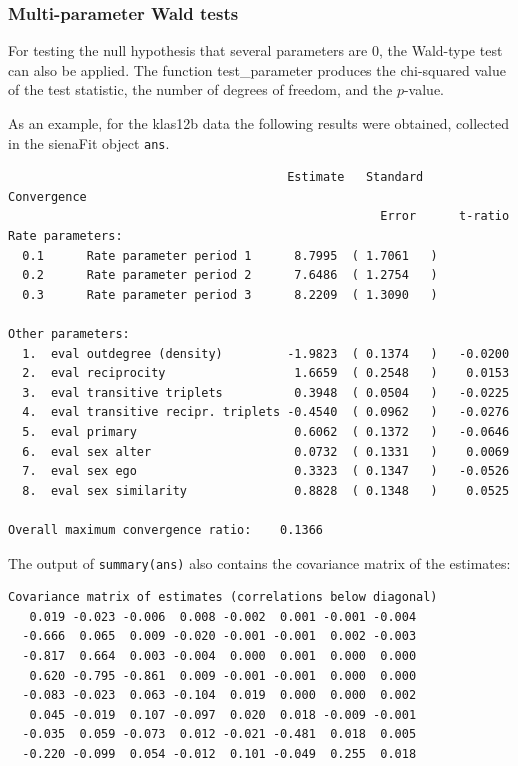 \documentclass[a4paper,fleqn,11pt]{article}
\newcommand{\+}{\, + \,}
\newcommand{\sfn}[1]{\textsf{#1}}
\begin{document}
\subsubsection{Multi-parameter Wald tests}

For testing  the null hypothesis that several parameters are 0,
the Wald-type test can also be applied.
The function \sfn{test\_parameter} produces the chi-squared value of the
test statistic, the number of degrees of freedom, and the $p$-value.

As an example, for the \textsf{klas12b} data
the following results were obtained,
collected in the \textsf{sienaFit} object \texttt{ans}.
{
\begin{small}
\begin{verbatim}
                                       Estimate   Standard   Convergence
                                                    Error      t-ratio
Rate parameters:
  0.1      Rate parameter period 1      8.7995  ( 1.7061   )
  0.2      Rate parameter period 2      7.6486  ( 1.2754   )
  0.3      Rate parameter period 3      8.2209  ( 1.3090   )

Other parameters:
  1.  eval outdegree (density)         -1.9823  ( 0.1374   )   -0.0200
  2.  eval reciprocity                  1.6659  ( 0.2548   )    0.0153
  3.  eval transitive triplets          0.3948  ( 0.0504   )   -0.0225
  4.  eval transitive recipr. triplets -0.4540  ( 0.0962   )   -0.0276
  5.  eval primary                      0.6062  ( 0.1372   )   -0.0646
  6.  eval sex alter                    0.0732  ( 0.1331   )    0.0069
  7.  eval sex ego                      0.3323  ( 0.1347   )   -0.0526
  8.  eval sex similarity               0.8828  ( 0.1348   )    0.0525

Overall maximum convergence ratio:    0.1366
\end{verbatim}
\end{small}
}
\noindent
The output of \texttt{summary(ans)} also contains the
covariance matrix of the estimates:
\begin{footnotesize}
\begin{verbatim}
Covariance matrix of estimates (correlations below diagonal)
   0.019 -0.023 -0.006  0.008 -0.002  0.001 -0.001 -0.004
  -0.666  0.065  0.009 -0.020 -0.001 -0.001  0.002 -0.003
  -0.817  0.664  0.003 -0.004  0.000  0.001  0.000  0.000
   0.620 -0.795 -0.861  0.009 -0.001 -0.001  0.000  0.000
  -0.083 -0.023  0.063 -0.104  0.019  0.000  0.000  0.002
   0.045 -0.019  0.107 -0.097  0.020  0.018 -0.009 -0.001
  -0.035  0.059 -0.073  0.012 -0.021 -0.481  0.018  0.005
  -0.220 -0.099  0.054 -0.012  0.101 -0.049  0.255  0.018
\end{verbatim}
\end{footnotesize}
\end{document}
